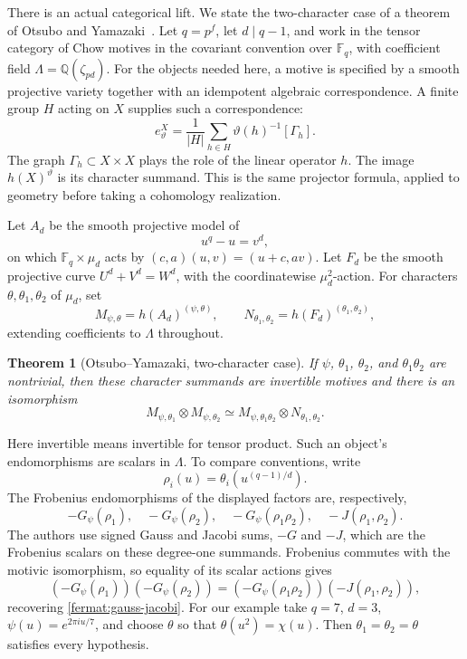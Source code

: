 \documentclass[11pt]{article}
\newtheorem{theorem}[proposition]{Theorem}
\theoremstyle{remark}
\begin{document}
There is an actual categorical lift. We state the two-character case of a theorem of Otsubo and Yamazaki~\cite{otsubo-yamazaki}. Let \(q=p^f\), let \(d\mid q-1\), and work in the tensor category of Chow motives in the covariant convention over \(\mathbb F_q\), with coefficient field \(\Lambda=\mathbb Q(\zeta_{pd})\). For the objects needed here, a motive is specified by a smooth projective variety together with an idempotent algebraic correspondence. A finite group \(H\) acting on \(X\) supplies such a correspondence:
\[
e_\vartheta^X=\frac1{|H|}\sum_{h\in H}
\vartheta(h)^{-1}[\Gamma_h].
\]
The graph \(\Gamma_h\subset X\times X\) plays the role of the linear operator \(h\). The image \(h(X)^\vartheta\) is its character summand. This is the same projector formula, applied to geometry before taking a cohomology realization.

Let \(A_d\) be the smooth projective model of
\[
u^q-u=v^d,
\]
on which \(\mathbb F_q\times\mu_d\) acts by \((c,a)(u,v)=(u+c,av)\). Let \(F_d\) be the smooth projective curve \(U^d+V^d=W^d\), with the coordinatewise \(\mu_d^2\)-action. For characters \(\theta,\theta_1,\theta_2\) of \(\mu_d\), set
\[
M_{\psi,\theta}=h(A_d)^{(\psi,\theta)},\qquad
N_{\theta_1,\theta_2}=h(F_d)^{(\theta_1,\theta_2)},
\]
extending coefficients to \(\Lambda\) throughout.

\begin{theorem}[Otsubo--Yamazaki, two-character case]
If \(\psi\), \(\theta_1\), \(\theta_2\), and \(\theta_1\theta_2\) are nontrivial, then these character summands are invertible motives and there is an isomorphism
\begin{equation}
M_{\psi,\theta_1}\otimes M_{\psi,\theta_2}
\simeq
M_{\psi,\theta_1\theta_2}\otimes N_{\theta_1,\theta_2}.
\label{fermat:motivic-identity}
\end{equation}
\end{theorem}

Here invertible means invertible for tensor product. Such an object's endomorphisms are scalars in \(\Lambda\). To compare conventions, write
\[
\rho_i(u)=\theta_i\!\left(u^{(q-1)/d}\right).
\]
The Frobenius endomorphisms of the displayed factors are, respectively,
\[
-G_\psi(\rho_1),\quad -G_\psi(\rho_2),\quad
-G_\psi(\rho_1\rho_2),\quad -J(\rho_1,\rho_2).
\]
The authors use signed Gauss and Jacobi sums, \(-G\) and \(-J\), which are the Frobenius scalars on these degree-one summands. Frobenius commutes with the motivic isomorphism, so equality of its scalar actions gives
\[
(-G_\psi(\rho_1))(-G_\psi(\rho_2))
=(-G_\psi(\rho_1\rho_2))(-J(\rho_1,\rho_2)),
\]
recovering \eqref{fermat:gauss-jacobi}. For our example take \(q=7\), \(d=3\), \(\psi(u)=e^{2\pi iu/7}\), and choose \(\theta\) so that \(\theta(u^2)=\chi(u)\). Then \(\theta_1=\theta_2=\theta\) satisfies every hypothesis.
\end{document}
